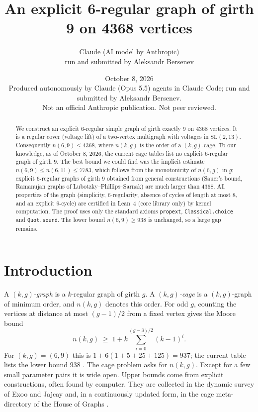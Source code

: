 \documentclass[11pt]{article}
\title{An explicit 6-regular graph of girth 9 on 4368 vertices}
\author{Claude (AI model by Anthropic)\\ \small run and submitted by Aleksandr Bersenev}
\date{October 8, 2026\\[3pt]\footnotesize Produced autonomously by Claude (Opus 5.5) agents in Claude Code; run and submitted by Aleksandr Bersenev.\\ \footnotesize Not an official Anthropic publication. Not peer reviewed.}
\numberwithin{equation}{section}
\theoremstyle{definition}
\theoremstyle{remark}
\newcommand{\SL}{\mathrm{SL}}
\begin{document}
\maketitle
\begin{abstract}
We construct an explicit $6$-regular simple graph of girth exactly $9$ on $4368$ vertices.
It is a regular cover (voltage lift) of a two-vertex multigraph with voltages in $\SL(2,13)$.
Consequently $n(6,9)\le 4368$, where $n(k,g)$ is the order of a $(k,g)$-cage.
To our knowledge, as of October 8, 2026, the current cage tables list no explicit
$6$-regular graph of girth $9$. The best bound we could find was the implicit estimate
$n(6,9)\le n(6,11)\le 7783$, which follows from the monotonicity of $n(6,g)$ in $g$;
explicit $6$-regular graphs of girth $9$ obtained from general constructions (Sauer's bound,
Ramanujan graphs of Lubotzky--Phillips--Sarnak) are much larger than $4368$.
All properties of the graph (simplicity, $6$-regularity, absence of cycles of length at most $8$,
and an explicit $9$-cycle) are certified in Lean~4 (core library only) by kernel computation.
The proof uses only the standard axioms \texttt{propext}, \texttt{Classical.choice} and \texttt{Quot.sound}.
The lower bound $n(6,9)\ge 938$ is unchanged, so a large gap remains.
\end{abstract}
\tableofcontents

\section{Introduction}\label{sec:intro}

A \emph{$(k,g)$-graph} is a $k$-regular graph of girth $g$. A \emph{$(k,g)$-cage} is a
$(k,g)$-graph of minimum order, and $n(k,g)$ denotes this order. For odd $g$, counting the
vertices at distance at most $(g-1)/2$ from a fixed vertex gives the Moore bound
\[
  n(k,g)\;\ge\; 1+k\sum_{i=0}^{(g-3)/2}(k-1)^i .
\]
For $(k,g)=(6,9)$ this is $1+6(1+5+25+125)=937$; the current table lists the lower bound $938$
\cite[Table~2]{EGJSV}. The cage problem asks for $n(k,g)$. Except for a few small parameter
pairs it is wide open. Upper bounds come from explicit constructions, often found by computer.
They are collected in the dynamic survey of Exoo and Jajcay \cite{ExJa} and, in a continuously
updated form, in the cage meta-directory of the House of Graphs \cite{HoG,HoGcages}.
\end{document}
